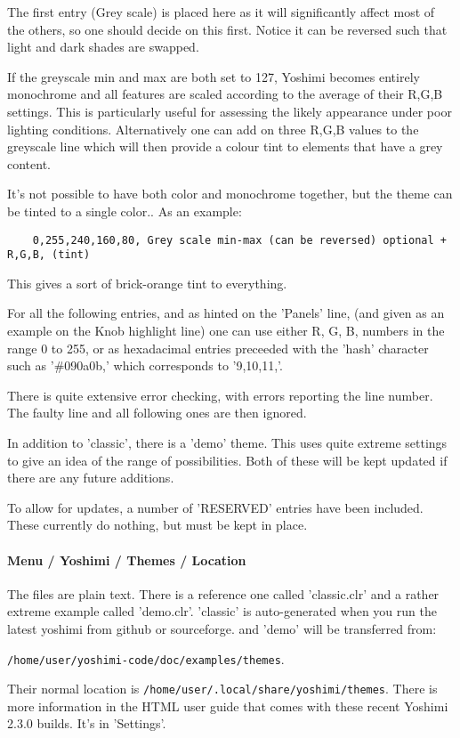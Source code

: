    The first entry (Grey scale) is placed here as it will significantly affect
   most of the others, so one should decide on this first. Notice it can be
   reversed such that light and dark shades are swapped.

   If the greyscale min and max are both set to 127, Yoshimi becomes entirely
   monochrome and all features are scaled according to the average of their
   R,G,B settings. This is particularly useful for assessing the likely
   appearance under poor lighting conditions. Alternatively one can add on
   three R,G,B values to the greyscale line which will then provide a colour
   tint to elements that have a grey content.

   It's not possible to have both color and monochrome together, but the theme
   can be tinted to a single color..
   As an example:

   \begin{verbatim}
    0,255,240,160,80, Grey scale min-max (can be reversed) optional + R,G,B, (tint)
   \end{verbatim}

   This gives a sort of brick-orange tint to everything.

   For all the following entries, and as hinted on the 'Panels' line, (and given
   as an example on the Knob highlight line) one can use either R, G, B, numbers
   in the range 0 to 255, or as hexadacimal entries preceeded with the 'hash'
   character such as '\#090a0b,' which corresponds to '9,10,11,'.

   There is quite extensive error checking, with errors reporting the line
   number. The faulty line and all following ones are then ignored.

   In addition to 'classic', there is a 'demo' theme. This uses quite extreme
   settings to give an idea of the range of possibilities. Both of these will be
   kept updated if there are any future additions.

   To allow for updates, a number of 'RESERVED' entries have been included. These
   currently do nothing, but must be kept in place.

\paragraph{Menu / Yoshimi / Themes / Location}
\label{paragraph:menu_yoshimi_themes_location}

   The files are plain text. There is a reference one called 'classic.clr' and a
   rather extreme example called 'demo.clr'.
   'classic' is auto-generated when you run the latest yoshimi from github or
   sourceforge. and 'demo' will be transferred from:

   \texttt{/home/user/yoshimi-code/doc/examples/themes}.

   Their normal location is \texttt{/home/user/.local/share/yoshimi/themes}.
   There is more information in the HTML user guide that comes with these recent
   Yoshimi 2.3.0 builds.
   It's in 'Settings'.

